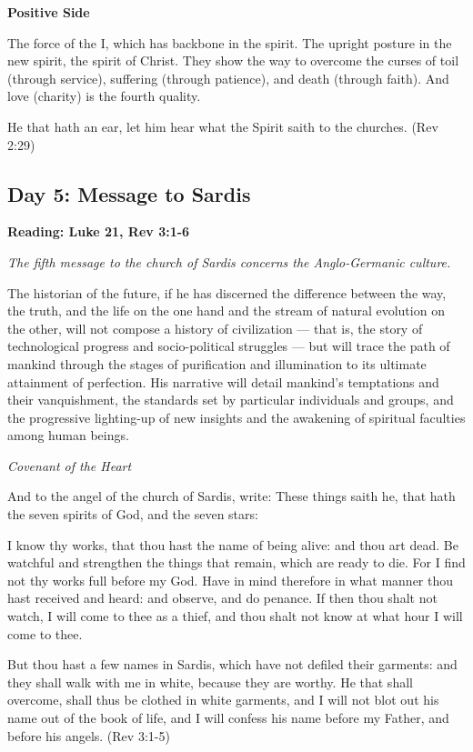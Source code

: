 \textbf{Positive Side}

The force of the I, which has backbone in the spirit. The upright posture in the new spirit, the spirit of Christ. They
show the way to overcome the curses of toil (through service), suffering (through patience), and death (through faith).
And love (charity) is the fourth quality.

He that hath an ear, let him hear what the Spirit saith to the churches. (Rev 2:29)

\subsection*{Day 5: Message to Sardis}
\textbf{Reading: Luke 21, Rev 3:1-6}

\emph{The fifth message to the church of Sardis concerns the Anglo-Germanic culture.}

\begin{quotationx}
The historian of the future, if he has discerned the difference between the way, the truth, and the life on the one hand
and the stream of natural evolution on the other, will not compose a history of civilization —
that is, the story of technological progress and socio-political struggles — but will trace the
path of mankind through the stages of purification and illumination to its ultimate attainment of perfection. His
narrative will detail mankind's temptations and their vanquishment, the standards set by
particular individuals and groups, and the progressive lighting-up of new insights and the awakening of spiritual
faculties among human beings. \begin{flushright} \emph{Covenant of the Heart}
\end{flushright}
\end{quotationx}

And to the angel of the church of Sardis, write: These things saith he, that hath the seven spirits of God, and the
seven stars:

I know thy works, that thou hast the name of being alive: and thou art dead. Be watchful and strengthen the things that
remain, which are ready to die. For I find not thy works full before my God. Have in mind therefore in what manner thou
hast received and heard: and observe, and do penance. If then thou shalt not watch, I will come to thee as a thief, and
thou shalt not know at what hour I will come to thee.

But thou hast a few names in Sardis, which have not defiled their garments: and they shall walk with me in white,
because they are worthy. He that shall overcome, shall thus be clothed in white garments, and I will not blot out his
name out of the book of life, and I will confess his name before my Father, and before his angels. (Rev 3:1-5)

